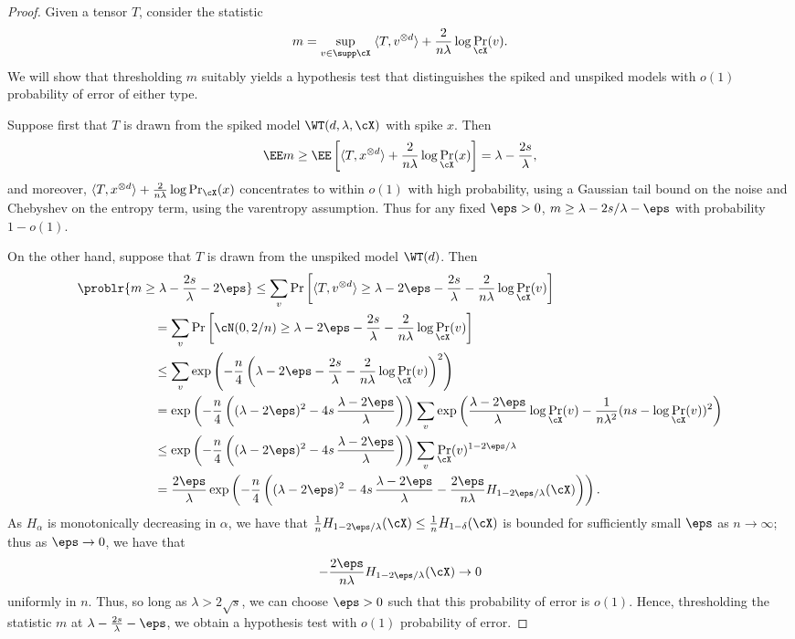 \documentclass{article}
\begin{document}
\begin{proof}
Given a tensor $T$, consider the statistic
\begin{equation}
\label{eq:map}
m = \sup_{v \in \supp \cX}\; \langle T, v^{\otimes d} \rangle + \frac{2}{n\lambda} \log \Pr_\cX(v).
\end{equation}
We will show that thresholding $m$ suitably yields a hypothesis test that distinguishes the spiked and unspiked models with $o(1)$ probability of error of either type.

Suppose first that $T$ is drawn from the spiked model $\WT(d,\lambda,\cX)$ with spike $x$. Then
$$ \EE m \geq \EE\left[ \langle T, x^{\otimes d} \rangle + \frac{2}{n\lambda} \log \Pr_\cX(x) \right] = \lambda - \frac{2s}{\lambda}, $$
and moreover, $\langle T, x^{\otimes d} \rangle + \frac{2}{n\lambda} \log \Pr_\cX(x)$ concentrates to within $o(1)$ with high probability, using a Gaussian tail bound on the noise and Chebyshev on the entropy term, using the varentropy assumption. Thus for any fixed $\eps > 0$, $m \ge \lambda - 2s/\lambda - \eps$ with probability $1 - o(1)$.

On the other hand, suppose that $T$ is drawn from the unspiked model $\WT(d)$. Then
\begin{align*}
    &\problr{m \geq \lambda - \frac{2s}{\lambda} - 2\eps}
    \leq \sum_v \Pr\left[ \langle T, v^{\otimes d} \rangle \geq \lambda - 2\eps - \frac{2s}{\lambda} - \frac{2}{n\lambda} \log \Pr_\cX(v) \right] \\
    &\qquad\qquad\qquad= \sum_v \Pr\left[ \cN(0,2/n) \geq \lambda - 2\eps - \frac{2s}{\lambda} - \frac{2}{n\lambda} \log \Pr_\cX(v) \right] \\
    &\qquad\qquad\qquad\leq \sum_v \exp\left( -\frac{n}{4} \left(\lambda - 2\eps - \frac{2s}{\lambda} - \frac{2}{n\lambda} \log \Pr_\cX(v) \right)^2 \right) \\
    &\qquad\qquad\qquad= \exp\left(-\frac{n}{4} \left( (\lambda-2\eps)^2 - 4s\, \frac{\lambda-2\eps}{\lambda} \right) \right) \sum_v \exp\left( \frac{\lambda-2\eps}{\lambda} \log\Pr_\cX(v) - \frac{1}{n \lambda^2} (ns - \log \Pr_\cX(v))^2 \right) \\
    &\qquad\qquad\qquad\leq \exp\left(-\frac{n}{4} \left( (\lambda-2\eps)^2 - 4s\, \frac{\lambda-2\eps}{\lambda} \right) \right) \sum_v \Pr_\cX(v)^{1-2\eps/\lambda} \\
    &\qquad\qquad\qquad= \frac{2\eps}{\lambda} \exp\left(-\frac{n}{4} \left( (\lambda-2\eps)^2 - 4s\, \frac{\lambda-2\eps}{\lambda} - \frac{2\eps}{n\lambda} H_{1-2\eps/\lambda}(\cX) \right) \right).
\end{align*}
As $H_\alpha$ is monotonically decreasing in $\alpha$, we have that $\frac1n H_{1-2\eps/\lambda}(\cX) \leq \frac1n H_{1-\delta}(\cX)$ is bounded for sufficiently small $\eps$ as $n \to \infty$; thus as $\eps \to 0$, we have that
$$ -\frac{2\eps}{n\lambda} H_{1-2\eps/\lambda}(\cX) \to 0 $$
uniformly in $n$. Thus, so long as $\lambda > 2 \sqrt{s}$, we can choose $\eps > 0$ such that this probability of error is $o(1)$. Hence, thresholding the statistic $m$ at $\lambda - \frac{2s}{\lambda} - \eps$, we obtain a hypothesis test with $o(1)$ probability of error.


\end{proof}
\end{document}
